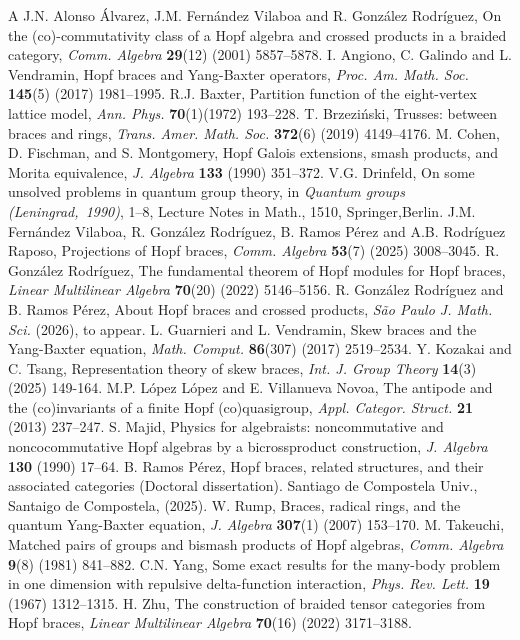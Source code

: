 \documentclass[11pt,reqno]{amsart}
\theoremstyle{plain}%
\theoremstyle{definition}
\theoremstyle{remark}
\begin{document}

\begin{thebibliography}{A}
 J.N. Alonso Álvarez, J.M. Fernández Vilaboa and R. González Rodríguez, On the (co)-commutativity class of a Hopf algebra and crossed products in a braided category, \emph{Comm. Algebra} {\bf 29}(12) (2001) 5857--5878.
 I. Angiono, C. Galindo and L. Vendramin, Hopf braces and Yang-Baxter operators, \emph{Proc. Am. Math. Soc.} {\bf 145}(5) (2017) 1981--1995.
 R.J. Baxter, Partition function of the eight-vertex lattice model, \emph{Ann. Phys.} {\bf 70}(1)(1972) 193--228.
 T. Brzezi{\'n}ski, Trusses: between braces and rings, \emph{Trans. Amer. Math. Soc.} {\bf 372}(6) (2019) 4149--4176.
 M. Cohen, D. Fischman, and S. Montgomery, Hopf Galois extensions, smash products, and Morita equivalence, \emph{J. Algebra } {\bf 133} (1990) 351--372.
 V.G. Drinfeld, On some unsolved problems in quantum group theory, in \emph{Quantum groups (Leningrad,~1990)}, 1--8, Lecture Notes in Math., 1510, Springer,Berlin.
 J.M. Fernández Vilaboa, R. González Rodríguez, B. Ramos Pérez and A.B. Rodríguez Raposo, Projections of Hopf braces, \emph{Comm. Algebra} {\bf 53}(7) (2025) 3008--3045. 
 R. González Rodríguez, The fundamental theorem of Hopf modules for Hopf braces, \emph{Linear Multilinear Algebra} {\bf70}(20) (2022) 5146--5156.
 R. González Rodríguez and B. Ramos Pérez, About Hopf braces and crossed products, \emph{São Paulo J. Math. Sci.} (2026), to appear.
 L. Guarnieri and L. Vendramin, Skew braces and the Yang-Baxter equation, \emph{Math. Comput.} {\bf 86}(307) (2017) 2519--2534.
 Y. Kozakai and C. Tsang, Representation theory of skew braces, \emph{Int. J. Group Theory} {\bf 14}(3) (2025) 149-164.
 M.P. López López and E. Villanueva Novoa, The antipode and the (co)invariants of a finite Hopf (co)quasigroup, \emph{Appl. Categor. Struct. } {\bf 21} (2013) 237--247.
 S. Majid, Physics for algebraists: noncommutative and noncocommutative Hopf algebras by a bicrossproduct construction, \emph{J. Algebra} {\bf 130} (1990) 17--64.
B. Ramos Pérez,  Hopf braces, related structures, and their associated categories (Doctoral dissertation). Santiago de Compostela Univ., Santaigo de Compostela, (2025).
 W. Rump, Braces, radical rings, and the quantum Yang-Baxter equation, \emph{J. Algebra} {\bf 307}(1) (2007) 153--170.
 M. Takeuchi, Matched pairs of groups and bismash products of Hopf algebras, \emph{Comm. Algebra} {\bf 9}(8) (1981) 841--882.
 C.N. Yang, Some exact results for the many-body problem in one dimension with repulsive delta-function interaction, \emph{Phys. Rev. Lett.} {\bf 19} (1967) 1312--1315.
 H. Zhu, The construction of braided tensor categories from Hopf braces, \emph{Linear Multilinear Algebra} {\bf 70}(16) (2022) 3171--3188.

\end{thebibliography}
\end{document}

